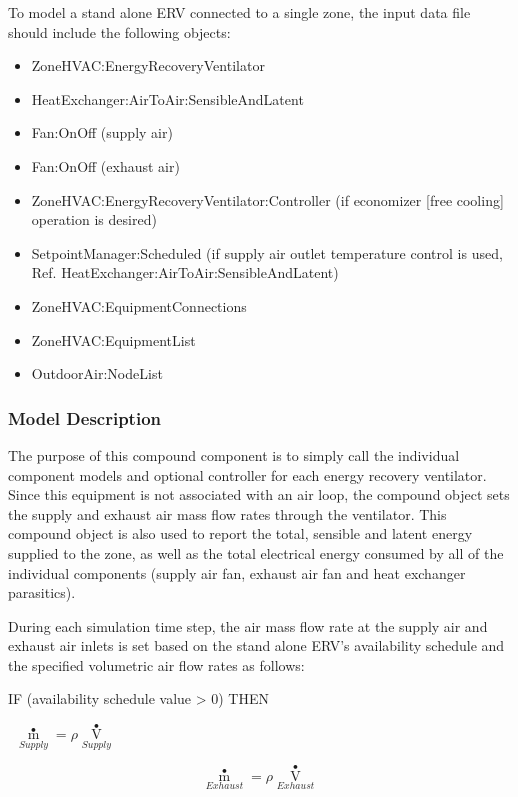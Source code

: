 To model a stand alone ERV connected to a single zone, the input data file should include the following objects:

\begin{itemize}
\item
  ZoneHVAC:EnergyRecoveryVentilator
\item
  HeatExchanger:AirToAir:SensibleAndLatent
\item
  Fan:OnOff (supply air)
\item
  Fan:OnOff (exhaust air)
\item
  ZoneHVAC:EnergyRecoveryVentilator:Controller (if economizer {[}free cooling{]} operation is desired)
\item
  SetpointManager:Scheduled (if supply air outlet temperature control is used, Ref. HeatExchanger:AirToAir:SensibleAndLatent)
\item
  ZoneHVAC:EquipmentConnections
\item
  ZoneHVAC:EquipmentList
\item
  OutdoorAir:NodeList
\end{itemize}

\subsubsection{Model Description}\label{model-description-3-004}

The purpose of this compound component is to simply call the individual component models and optional controller for each energy recovery ventilator. Since this equipment is not associated with an air loop, the compound object sets the supply and exhaust air mass flow rates through the ventilator. This compound object is also used to report the total, sensible and latent energy supplied to the zone, as well as the total electrical energy consumed by all of the individual components (supply air fan, exhaust air fan and heat exchanger parasitics).

During each simulation time step, the air mass flow rate at the supply air and exhaust air inlets is set based on the stand alone ERV's availability schedule and the specified volumetric air flow rates as follows:

IF (availability schedule value \textgreater{} 0) THEN

~\({\mathop m\limits^ \bullet_{Supply}} = \rho {\mathop V\limits^ \bullet_{Supply}}\)

\begin{equation}
{\mathop m\limits^ \bullet_{Exhaust}} = \rho {\mathop V\limits^ \bullet_{Exhaust}}
\end{equation}

